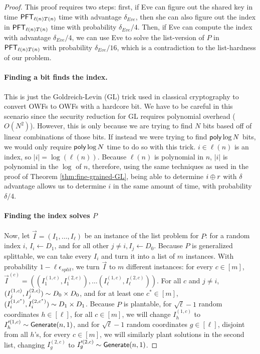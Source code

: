\begin{proof}
	This proof requires two steps: first, if Eve can figure out the shared key in time $\mathsf{PFT}_{\ell(n)T(n)}$ time with advantage $\delta_{Eve}$, then she can also figure out the index in $\mathsf{PFT}_{\ell(n)T(n)}$ time with probability $\delta_{Eve}/4$. Then, if Eve can compute the index with advantage $\delta_{Eve}/4$, we can use Eve to solve the list-version of $P$ in $\mathsf{PFT}_{\ell(n)T(n)}$ with probability $\delta_{Eve}/16$, which is a contradiction to the list-hardness of our problem.
	
	\paragraph{Finding a bit finds the index.} This is just the Goldreich-Levin (GL) trick used in classical cryptography to convert OWFs to OWFs with a hardcore bit. We have to be careful in this scenario since the security reduction for GL requires polynomial overhead ($O(N^2)$). However, this is only because we are trying to find $N$ bits based off of linear combinations of those bits. If instead we were trying to find $\mathsf{poly} \log N$ bits, we would only require $\mathsf{poly}\log N$ time to do so with this trick. $i \in \ell(n)$ is an index, so $|i| = \log(\ell(n))$. Because $\ell(n)$ is polynomial in $n$, $|i|$ is polynomial in the $\log$ of $n$, therefore, using the same techniques as used in the proof of Theorem \ref{thm:fine-grained-GL}, being able to determine $i \oplus r$ with $\delta$ advantage allows us to determine $i$ in the same amount of time, with probability $\delta/4$.
	
	\paragraph{Finding the index solves $P$} Now, let $\vec I = ( I_1, \ldots, I_\ell )$ be an instance of the list problem for $P$: for a random index $i$, $I_i \gets D_1$, and for all other $j \neq i, I_j \gets D_0$.
	Because $P$ is generalized splittable, we can take every $I_i$ and turn it into a list of $m$ instances. With probability $1 - \ell \epsilon_{split}$, we turn $\vec I$ to $m$ different instances: for every $c \in [m]$, $\vec I^{(c)} = ( (I_1^{(1,c)}, I_1^{(2,c)}), \ldots  (I_\ell^{(1,c)}, I_\ell^{(2, c)} ))$.
	For all $c$ and $j \neq i$, $(I_j^{(1, c)}, I_j^{(2,c)}) \sim D_0 \times D_0$, and for at least one $c^* \in [m]$, $( I_i^{(1, c^*)}, I_i^{(2,c^*)} ) \sim D_1 \times D_1$. Because $P$ is plantable, for $\sqrt \ell - 1$ random coordinates $h \in [\ell]$, for all $c \in [m]$, we will change $I_h^{(1, c)}$ to $I_h'^{(1, c)} \sim \mathsf{Generate}(n,1)$, and for $\sqrt \ell - 1$ random coordinates $g \in [\ell]$, disjoint from all $h$'s, for every $c \in [m]$, we will similarly plant solutions in the second list, changing $I_g^{(2, c)}$ to $I_g'^{(2, c)} \sim \mathsf{Generate}(n,1)$.
	

\end{proof}

